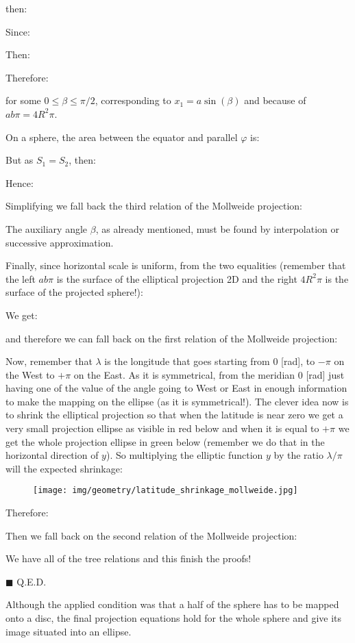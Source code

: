 \begin{dem}
	then:
	
	Since:
	
	Then:
	
	Therefore:
	
	for some $0 \leq \beta \leq \pi/2$, corresponding to $x_{1}=a \sin (\beta)$ and because of $a b \pi=4 R^2 \pi$.
	
	On a sphere, the area between the equator and parallel $\varphi$ is:
	
	But as $S_{1}=S_{2}$, then:
	
	Hence:
	
	Simplifying we fall back the third relation of the Mollweide projection:
	
	The auxiliary angle $\beta$, as already mentioned, must be found by interpolation or successive approximation. 
	
	Finally, since horizontal scale is uniform, from the two equalities (remember that the left $ab\pi$ is the surface of the elliptical projection 2D and the right $4R^2\pi$ is the surface of the projected sphere!):
	
	We get:
	
	and therefore we can fall back on the first relation of the Mollweide projection:
	
	Now, remember that $\lambda$ is the longitude that goes starting from $0$ [rad], to $-\pi$ on the West to $+\pi$ on the East. As it is symmetrical, from the meridian $0$ [rad] just having one of the value of the angle going to West or East in enough information to make the mapping on the ellipse (as it is symmetrical!). The clever idea now is to shrink the elliptical projection so that when the latitude is near zero we get a very small projection ellipse as visible in red below and when it is equal to $+\pi$  we get the whole projection ellipse in green below (remember we do that in the horizontal direction of $y$). So multiplying the elliptic function $y$ by the ratio $\lambda/\pi$ will the expected shrinkage:
	
	\begin{figure}[H]
		\centering
		\texttt{[image: img/geometry/latitude\_shrinkage\_mollweide.jpg]}
	\end{figure}
	Therefore:
	
	Then we fall back on the second relation of the Mollweide projection:
	
	We have all of the tree relations and this finish the proofs!
	\begin{flushright}
		$\blacksquare$  Q.E.D.
	\end{flushright}
	\end{dem}
	Although the applied condition was that a half of the sphere has to be mapped onto a disc, the final projection equations hold for the whole sphere and give its image situated into an ellipse.
	
